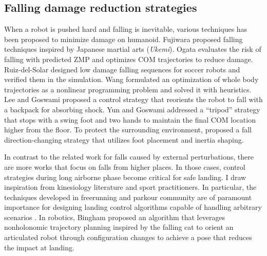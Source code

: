 \subsection{Falling damage reduction strategies}
When a robot is pushed hard and falling is inevitable, 
various techniques has been proposed to minimize damage on humanoid. 
Fujiwara \etal
\cite{Fujiwara:2002:UFM,Fujiwara:2003:FHH,Fujiwara:2006:TOF,Fujiwara:2007:OPF}
proposed falling techniques inspired by Japanese martial arts (\emph{Ukemi}).
Ogata \etal \cite{Ogata:2007:FMC,Ogata:2008:RSG} evaluates the risk of falling with
predicted ZMP and optimizes COM trajectories to reduce damage. 
Ruiz-del-Solar \etal \cite{Ruiz:2009:LTF,Ruiz:2010:FDM} designed low damage
falling sequences for soccer robots and verified them in the simulation. 
Wang \etal \cite{Wang:2012:WTO} formulated an optimization of whole body
trajectories as a nonlinear programming problem and solved it with heuristics.
Lee and Goswami \cite{Lee:2012:FOB} proposed a control strategy that
reorients the robot to fall with a backpack for absorbing shock. 
Yun and Goswami \cite{Yun:2014:TFC} addressed a ``tripod'' strategy that
stops with a swing foot and two hands to maintain the final COM location
higher from the floor.   
To protect the surrounding environment, \cite{Goswami:2014:DCF} proposed a
fall direction-changing strategy that utilizes foot placement and inertia
shaping.

In contrast to the related work for falls caused by external perturbations,
there are more works that focus on falls from higher
places. In those cases, control strategies during long airborne phase
become critical for safe landing. I draw inspiration from
kinesiology literature and sport practitioners. In particular, the
techniques developed in freerunning and parkour community are of
paramount importance for designing landing control algorithms capable
of handling arbitrary scenarios
\cite{Edwardes:2009:TPF,HLJ:2011:URL}. 
In robotics, Bingham \etal \cite{Bingham:2014:OMA} proposed an algorithm 
that leverages nonholonomic trajectory planning inspired by the
falling cat to orient an articulated robot through configuration
changes to achieve a pose that reduces the impact at landing.

